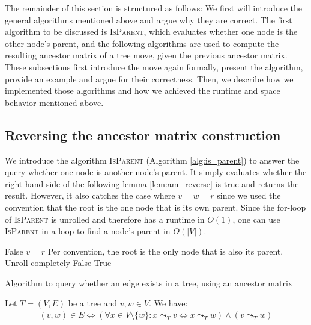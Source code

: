 The remainder of this section is structured as follows: We first will introduce the general algorithms mentioned above and argue why they are correct. The first algorithm to be discussed is \textsc{IsParent}, which evaluates whether one node is the other node's parent, and the following algorithms are used to compute the resulting ancestor matrix of a tree move, given the previous ancestor matrix. These subsections first introduce the move again formally, present the algorithm, provide an example and argue for their correctness. Then, we describe how we implemented those algorithms and how we achieved the runtime and space behavior mentioned above.

\subsection{Reversing the ancestor matrix construction}

We introduce the algorithm \textsc{IsParent} (Algorithm \ref{alg:is_parent}) to answer the query whether one node is another node's parent. It simply evaluates whether the right-hand side of the following lemma \ref{lem:am_reverse} is true and returns the result. However, it also catches the case where $v = w = r$ since we used the convention that the root is the one node that is its own parent. Since the for-loop of \textsc{IsParent} is unrolled and therefore has a runtime in $O(1)$, one can use \textsc{IsParent} in a loop to find a node's parent in $O(|V|)$.

\begin{algorithm}
    \begin{algorithmic}[1]
                \State \Return False
            \EndIf
                \State \Return $v = r$ \Comment Per convention, the root is the only node that is also its parent.
            \EndIf
             \Comment Unroll completely
                    \State \Return False
                \EndIf
            \EndFor
            \State \Return True
        \EndFunction
    \end{algorithmic}
    \caption{Algorithm to query whether an edge exists in a tree, using an ancestor matrix}
    \label{alg:is_parent}
\end{algorithm}

\begin{lemma}
    \label{lem:am_reverse}
    Let $T = (V, E)$ be a tree and $v, w \in V$. We have:
    \begin{align*}
        (v, w) \in E \Leftrightarrow (\forall x \in V \setminus \{w\}: x \leadsto_T v \Leftrightarrow x \leadsto_T w) \wedge (v \leadsto_T w)
    \end{align*}
\end{lemma}

